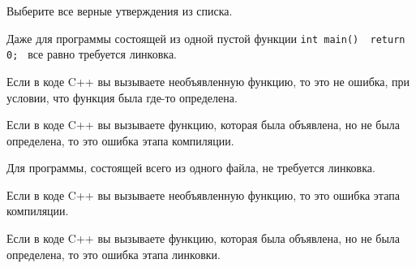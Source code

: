 \documentclass[
    9pt,
    hyperref={pdfencoding=unicode}
    ]{beamer}
\begin{document}
\begin{frame}
    Выберите все верные утверждения из списка.
    \begin{description}[align=left]
        \item[\XBox] Даже для программы состоящей из одной пустой функции \texttt{int main() { return 0; }} все равно требуется линковка.
        \item[\Square] Если в коде C++ вы вызываете необъявленную функцию, то это не ошибка, при условии, что функция была где-то определена.
        \item[\Square] Если в коде C++ вы вызываете функцию, которая была объявлена, но не была определена, то это ошибка этапа компиляции.
        \item[\Square] Для программы, состоящей всего из одного файла, не требуется линковка.
        \item[\XBox] Если в коде C++ вы вызываете необъявленную функцию, то это ошибка этапа компиляции.
        \item[\XBox] Если в коде C++ вы вызываете функцию, которая была объявлена, но не была определена, то это ошибка этапа линковки.
    \end{description}
\end{frame}
\end{document}
